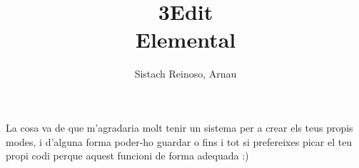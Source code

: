 \documentclass{article}
\title{3Edit\\Elemental}
\author{Sistach Reinoso, Arnau}
\begin{document}
La cosa va de que m'agradaria molt tenir un sistema per a crear els teus propis modes, i d'alguna forma poder-ho guardar o fins i tot si prefereixes picar el teu propi codi perque aquest funcioni de forma adequada :)
\end{document}
